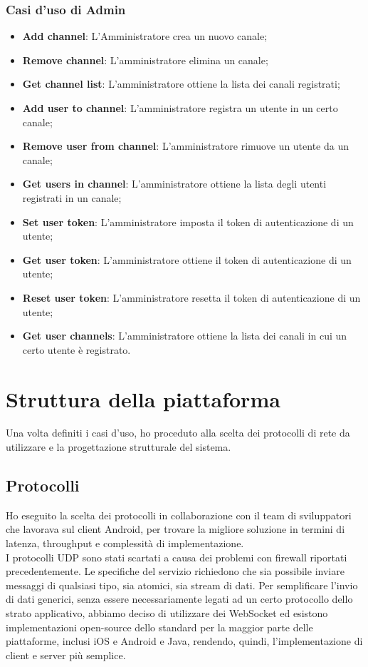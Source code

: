 		\subsubsection{Casi d'uso di Admin}
		\begin{itemize}
			\item \textbf{Add channel}: L'Amministratore crea un nuovo canale;
			\item \textbf{Remove channel}: L'amministratore elimina un canale;
			\item \textbf{Get channel list}: L'amministratore ottiene la lista dei canali registrati;
			\item \textbf{Add user to channel}: L'amministratore registra un utente in un certo canale;
			\item \textbf{Remove user from channel}: L'amministratore rimuove un utente da un canale;
			\item \textbf{Get users in channel}: L'amministratore ottiene la lista degli utenti registrati in un canale;
			\item \textbf{Set user token}: L'amministratore imposta il token di autenticazione di un utente;
			\item \textbf{Get user token}: L'amministratore ottiene il token di autenticazione di un utente;
			\item \textbf{Reset user token}: L'amministratore resetta il token di autenticazione di un utente;
			\item \textbf{Get user channels}: L'amministratore ottiene la lista dei canali in cui un certo utente è registrato.
		\end{itemize}
		

\section{Struttura della piattaforma}
Una volta definiti i casi d'uso, ho proceduto alla scelta dei protocolli di rete da utilizzare e la progettazione strutturale del sistema.
	\subsection{Protocolli}
	Ho eseguito la scelta dei protocolli in collaborazione con il team di sviluppatori che lavorava sul client Android, per trovare la migliore soluzione in termini di latenza, throughput e complessità di implementazione.
	\\
	I protocolli UDP sono stati scartati a causa dei problemi con firewall riportati precedentemente.
	Le specifiche del servizio richiedono che sia possibile inviare messaggi di qualsiasi tipo, sia atomici, sia stream di dati. Per semplificare l'invio di dati generici, senza essere necessariamente legati ad un certo protocollo dello strato applicativo, abbiamo deciso di utilizzare dei WebSocket ed esistono implementazioni open-source dello standard per la maggior parte delle piattaforme, inclusi iOS e Android e Java, rendendo, quindi, l'implementazione di client e server più semplice.
	
